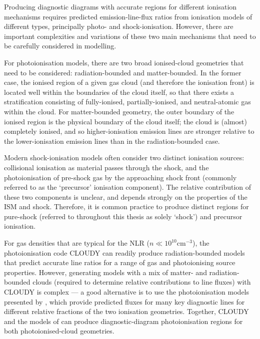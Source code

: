 Producing diagnostic diagrams with accurate regions for different ionisation mechanisms requires predicted emission-line-flux ratios from ionisation models of different types, principally photo- and shock-ionisation. However, there are important complexities and variations of these two main mechanisms that need to be carefully considered in modelling.

For photoionisation models, there are two broad ionised-cloud geometries that need to be considered: radiation-bounded and matter-bounded. In the former case, the ionised region of a given gas cloud (and therefore the ionisation front) is located well within the boundaries of the cloud itself, so that there exists a stratification consisting of fully-ionised, partially-ionised, and neutral-atomic gas within the cloud. For matter-bounded geometry, the outer boundary of the ionised region is the physical boundary of the cloud itself; the cloud is (almost) completely ionised, and so higher-ionisation emission lines are stronger relative to the lower-ionisation emission lines than in the radiation-bounded case. 

Modern shock-ionisation models often consider two distinct ionisation sources: collisional ionisation as material passes through the shock, and the photoionisation of pre-shock gas by the approaching shock front (commonly referred to as the `precursor' ionisation component). The relative contribution of these two components is unclear, and depends strongly on the properties of the ISM and shock. Therefore, it is common practice to produce distinct regions for pure-shock (referred to throughout this thesis as solely `shock') and precursor ionisation.

For gas densities that are typical for the NLR ($n\ll10^{10}$\;cm$^{-3}$), the photoionisation code \textsc{CLOUDY} \citep{Ferland2017} can readily produce radiation-bounded models that predict accurate line ratios for a range of gas and photoionising source properties. However, generating models with a mix of matter- and radiation-bounded clouds (required to determine relative contributions to line fluxes) with \textsc{CLOUDY} is complex --- a good alternative is to use the photoionisation models presented by \citet{Binette1996}, which provide predicted fluxes for many key diagnostic lines for different relative fractions of the two ionisation geometries. Together, \textsc{CLOUDY} and the models of \citet{Binette1996} can produce diagnostic-diagram photoionisation regions for both photoionised-cloud geometries.

